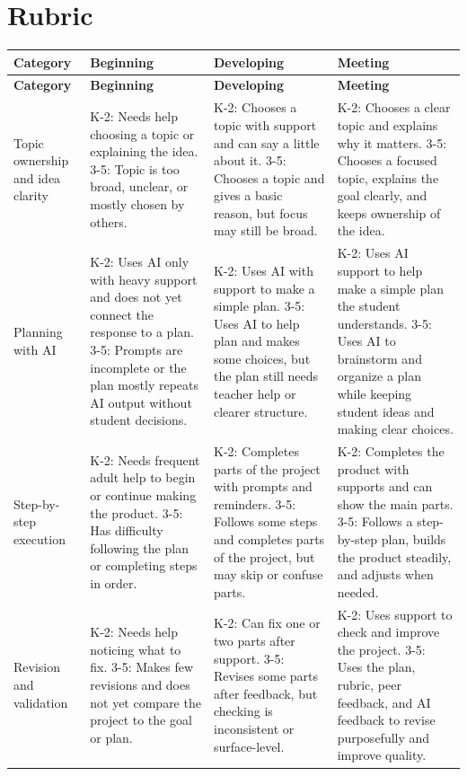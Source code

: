 \documentclass[11pt]{article}
\begin{document}
\section*{Rubric}
\renewcommand{\arraystretch}{1.25}
{\small
\begin{longtable}{|p{}|p{}|p{}|p{}|}
\hline
\textbf{Category} & \textbf{Beginning} & \textbf{Developing} & \textbf{Meeting} \\
\hline
\endfirsthead
\hline
\textbf{Category} & \textbf{Beginning} & \textbf{Developing} & \textbf{Meeting} \\
\hline
\endhead
Topic ownership and idea clarity &
K-2: Needs help choosing a topic or explaining the idea. 3-5: Topic is too broad, unclear, or mostly chosen by others. &
K-2: Chooses a topic with support and can say a little about it. 3-5: Chooses a topic and gives a basic reason, but focus may still be broad. &
K-2: Chooses a clear topic and explains why it matters. 3-5: Chooses a focused topic, explains the goal clearly, and keeps ownership of the idea. \\
\hline
Planning with AI &
K-2: Uses AI only with heavy support and does not yet connect the response to a plan. 3-5: Prompts are incomplete or the plan mostly repeats AI output without student decisions. &
K-2: Uses AI with support to make a simple plan. 3-5: Uses AI to help plan and makes some choices, but the plan still needs teacher help or clearer structure. &
K-2: Uses AI support to help make a simple plan the student understands. 3-5: Uses AI to brainstorm and organize a plan while keeping student ideas and making clear choices. \\
\hline
Step-by-step execution &
K-2: Needs frequent adult help to begin or continue making the product. 3-5: Has difficulty following the plan or completing steps in order. &
K-2: Completes parts of the project with prompts and reminders. 3-5: Follows some steps and completes parts of the project, but may skip or confuse parts. &
K-2: Completes the product with supports and can show the main parts. 3-5: Follows a step-by-step plan, builds the product steadily, and adjusts when needed. \\
\hline
Revision and validation &
K-2: Needs help noticing what to fix. 3-5: Makes few revisions and does not yet compare the project to the goal or plan. &
K-2: Can fix one or two parts after support. 3-5: Revises some parts after feedback, but checking is inconsistent or surface-level. &
K-2: Uses support to check and improve the project. 3-5: Uses the plan, rubric, peer feedback, and AI feedback to revise purposefully and improve quality. \\

\end{longtable}}
\end{document}
